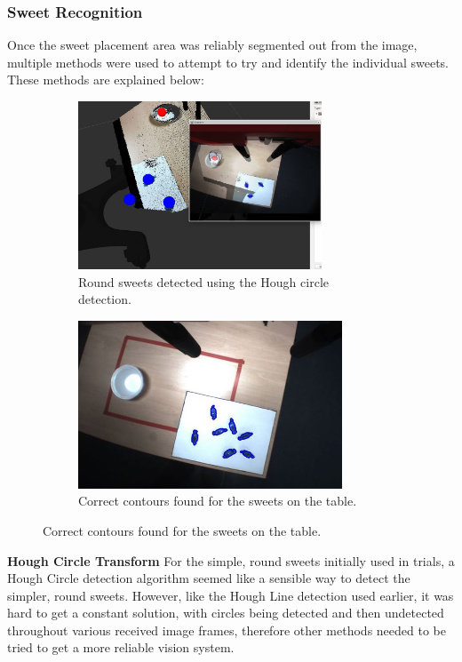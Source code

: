 \subsubsection{Sweet Recognition}
Once the sweet placement area was reliably segmented out from the image, multiple methods were used to attempt to try and identify the individual sweets. These methods are explained below:
\begin{figure}[H]
    \captionsetup[subfigure]{justification=centering}
    \begin{subfigure}[H]{0.475\textwidth}   
        \centering 
        \includegraphics[width=\textwidth, height=5cm]{sweettransformation.jpg}
        \caption{Round sweets detected using the Hough circle detection.}
        \label{fig:TimeGrasp}
    \end{subfigure}
    \begin{subfigure}[H]{0.475\textwidth}   
        \centering 
        \includegraphics[width=\textwidth, height=5cm]{sweetsfound.jpg}
        \caption{Correct contours found for the sweets on the table.}
        \label{fig:TimeGrasp}
    \end{subfigure}
\end{figure}
\textbf{Hough Circle Transform}
\newline
For the simple, round sweets initially used in trials, a Hough Circle detection algorithm seemed like a sensible way to detect the simpler, round sweets. However, like the Hough Line detection used earlier, it was hard to get a constant solution, with circles  being detected and then undetected throughout various received image frames, therefore other methods needed to be tried to get a more reliable vision system.
